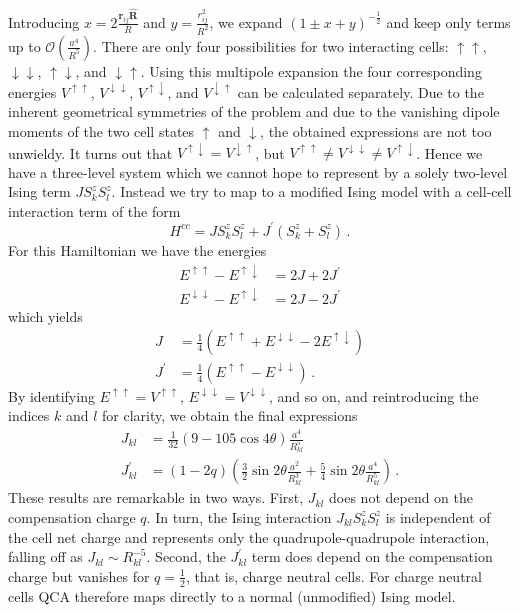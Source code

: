 %
Introducing $x = 2 \frac{\bm{r}_{ij} \hat{\bm{R}}}{R}$ and $y =
\frac{r_{ij}^2}{R^2}$, we expand $\left( 1 \pm x + y \right)^{-\frac{1}{2}}$ and
keep only terms up to $\mathcal{O}\left(\frac{a^4}{R^5}\right)$. There are only
four possibilities for two interacting cells: $\uparrow\uparrow$,
$\downarrow\downarrow$, $\uparrow\downarrow$, and $\downarrow\uparrow$. Using
this multipole expansion the four corresponding energies $V^{\uparrow\uparrow}$,
$V^{\downarrow\downarrow}$, $V^{\uparrow\downarrow}$, and
$V^{\downarrow\uparrow}$ can be calculated separately. Due to the inherent
geometrical symmetries of the problem and due to the vanishing dipole moments of
the two cell states $\uparrow$ and $\downarrow$, the obtained expressions are
not too unwieldy. It turns out that $V^{\uparrow\downarrow} =
V^{\downarrow\uparrow}$, but $V^{\uparrow\uparrow} \ne V^{\downarrow\downarrow}
\ne V^{\uparrow\downarrow}$. Hence we have a three-level system which we cannot
hope to represent by a solely two-level Ising term $J S^z_k S^z_l$. Instead we
try to map to a modified Ising model with a cell-cell interaction term of the
form
%
\begin{equation}
  H^{cc} = 
  J S^z_k S^z_l + 
  J^{\prime} \left( S^z_k + S^z_l \right) \, .
\end{equation}
%
For this Hamiltonian we have the energies
%
\begin{align}
  E^{\uparrow\uparrow} - E^{\uparrow\downarrow} &= 2J + 2J^{\prime} \\
  E^{\downarrow\downarrow} - E^{\uparrow\downarrow} &= 2J - 2J^{\prime}
\end{align}
%
which yields
%
\begin{align}
  J &= \frac{1}{4} 
  \left( 
    E^{\uparrow\uparrow} + E^{\downarrow\downarrow} - 2 E^{\uparrow\downarrow} 
  \right) \\
  J^{\prime} &= \frac{1}{4}
  \left( E^{\uparrow\uparrow} - E^{\downarrow\downarrow} \right) \, .
\end{align}
%
By identifying $E^{\uparrow\uparrow} = V^{\uparrow\uparrow}$,
$E^{\downarrow\downarrow} = V^{\downarrow\downarrow}$, and so on, and
reintroducing the indices $k$ and $l$ for clarity, we obtain the final
expressions
%
\begin{align}
  J_{kl}
  &=
  \frac{ 1 }{ 32 }
  \left(
    9 - 105 \cos{4 \theta}
  \right)
  \frac{ a^4 }{ R_{kl}^5 }
  \\
  J^{\prime}_{kl}
  &=
  \left( 1 - 2 q \right)
  \left(
    \frac{ 3 }{ 2 } \sin{2 \theta} \frac{ a^2 }{ R_{kl}^3 } +
    \frac{ 5 }{ 4 } \sin{2 \theta} \frac{ a^4 }{ R_{kl}^5 }
  \right) \, .
\end{align}
%
These results are remarkable in two ways. First, $J_{kl}$ does not depend on the
compensation charge $q$. In turn, the Ising interaction $J_{kl}
S^z_k S^z_l$ is independent of the cell net charge and represents only
the quadrupole-quadrupole interaction, falling off as $J_{kl} \sim R_{kl}^{-5}$.
Second, the $J^{\prime}_{kl}$ term does depend on the compensation charge but
vanishes for $q = \frac{1}{2}$, that is, charge neutral cells. For charge
neutral cells QCA therefore maps directly to a normal (unmodified) Ising model.

